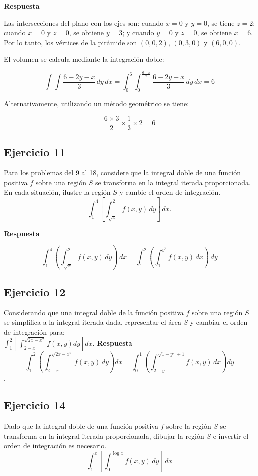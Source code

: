 \documentclass{report}
\begin{document}
\textbf{Respuesta}

Las intersecciones del plano con los ejes son: cuando $x=0$ y $y=0$, se tiene $z=2$; cuando $x=0$ y $z=0$, se obtiene $y=3$; y cuando $y=0$ y $z=0$, se obtiene $x=6$. Por lo tanto, los vértices de la pirámide son $(0,0,2)$, $(0,3,0)$ y $(6,0,0)$.

El volumen se calcula mediante la integración doble:

$$
\int \int \frac{6-2y-x}{3} \, dy \, dx = \int_0^6 \int_0^{\frac{6-x}{2}} \frac{6-2y-x}{3} \, dy \, dx = 6
$$

Alternativamente, utilizando un método geométrico se tiene:

$$
\frac{6 \times 3}{2} \times \frac{1}{3} \times 2 = 6
$$\subsection{Ejercicio 11}
Para los problemas del 9 al 18, considere que la integral doble de una función positiva $f$ sobre una región $S$ se transforma en la integral iterada proporcionada. En cada situación, ilustre la región $S$ y cambie el orden de integración.\\
\[\int_{1}^{4}\left[\int_{\sqrt{x}}^{2} f(x, y) \, dy\right] \, dx.\]

\textbf{Respuesta}

\[
\int_{1}^{4} \left( \int_{\sqrt{x}}^2 f(x,y) \, dy \right) \, dx = \int_1^{2} \left( \int_1^{y^2} f(x,y) \, dx \right) \, dy
\]\subsection{Ejercicio 12}
Considerando que una integral doble de la función positiva $f$ sobre una región $S$ se simplifica a la integral iterada dada, representar el área $S$ y cambiar el orden de integración para: \\ 
$\int_{1}^{2}\left[\int_{2-x}^{\sqrt{2 x-x^{2}}} f(x, y) d y\right] d x$.
\textbf{Respuesta} 
\[
\int_{1}^{2} \left( \int^{\sqrt{2x - x^2}}_{2-x} f(x,y) \, dy \right) dx = \int_0^{1} \left( \int^{\sqrt{1 - y^2} + 1}_{2 - y} f(x,y) \, dx \right) dy 
\].\subsection{Ejercicio 14}
Dado que la integral doble de una función positiva $f$ sobre la región $S$ se transforma en la integral iterada proporcionada, dibujar la región $S$ e invertir el orden de integración es necesario.
$$
\int_{1}^{e}\left[\int_{0}^{\log x} f(x, y) \, dy\right] \, dx
$$
\end{document}
